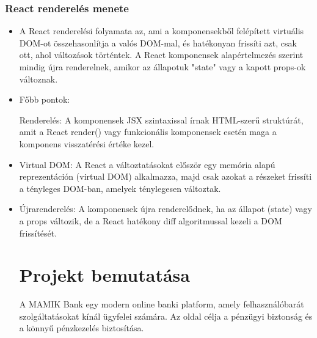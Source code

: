 \documentclass[colorlinks]{thesis-kando}
\theoremstyle{definition}
\theoremstyle{remark}
\begin{document}
\subsection{React renderelés menete}
\begin{itemize}
    \item A React renderelési folyamata az, ami a komponensekből felépített
    virtuális DOM-ot összehasonlítja a valós DOM-mal, és hatékonyan frissíti
    azt, csak ott, ahol változások történtek. A React komponensek
    alapértelmezés szerint mindig újra renderelnek, amikor az állapotuk
    "state" vagy a kapott props-ok változnak.
    \item Főbb pontok:

    Renderelés: A komponensek JSX szintaxissal írnak HTML-szerű
    struktúrát, amit a React render() vagy funkcionális komponensek esetén
    maga a komponens visszatérési értéke kezel.
    \item Virtual DOM: A React a változtatásokat először egy memória alapú
    reprezentáción (virtual DOM) alkalmazza, majd csak azokat a részeket
    frissíti a tényleges DOM-ban, amelyek ténylegesen változtak.
    \item Újrarenderelés: A komponensek újra renderelődnek, ha az állapot (state)
    vagy a props változik, de a React hatékony diff algoritmussal kezeli a
    DOM frissítését.
    
\chapter{Projekt bemutatása}
A MAMIK Bank egy modern online banki platform, amely felhasználóbarát szolgáltatásokat kínál ügyfelei számára. Az oldal célja a pénzügyi biztonság és a könnyű pénzkezelés biztosítása.

\newpage

\end{itemize}
\end{document}
